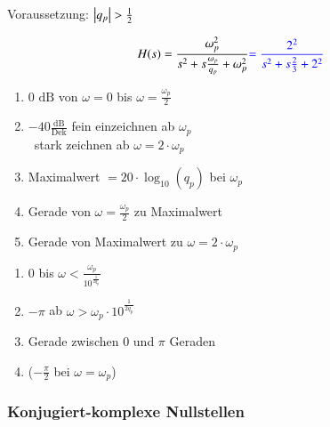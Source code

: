 \begin{minipage}[t]{0.48\columnwidth}
    \raggedright
    \begin{center}
        Voraussetzung: $\left|q_p\right| > \frac{1}{2}$
    \end{center}
    $$ H(s) = \frac{\omega_p^2}{s^2 + s \frac{\omega_p}{q_p} + \omega_p^2} {\color{blue}= \frac{2^2}{s^2 + s \frac{2}{3} + 2^2}} $$

    
\end{minipage}
\hfill
\begin{minipage}[t]{0.48\columnwidth}
        \begin{enumerate}
            \item 0 $\text{dB}$ von $\omega=0$ bis $\omega=\frac{\omega_p}{2}$
            \item $-40\frac{\text{dB}}{\text{Dek}}$ fein einzeichnen ab $\omega_p$\\
            \textrightarrow\ stark zeichnen ab $\omega = 2 \cdot \omega_p$
            \item Maximalwert $= 20\cdot \log_{10}(q_p)$ bei $\omega_p$
            \item Gerade von $\omega=\frac{\omega_p}{2}$ zu Maximalwert 
            \item Gerade von Maximalwert zu $\omega = 2 \cdot \omega_p$
        \end{enumerate}
        \begin{enumerate}
            \item 0 bis $\omega < \frac{\omega_p}{10^{\frac{1}{2 q_p}}}$
            \item $- \pi$ ab $\omega > \omega_p \cdot 10^{\frac{1}{2 q_p}}$
            \item Gerade zwischen $0$ und $\pi$ Geraden
            \item ($- \frac{\pi}{2}$ bei $\omega = \omega_p$)
        \end{enumerate}
\end{minipage}


\subsubsection{Konjugiert-komplexe Nullstellen} 


